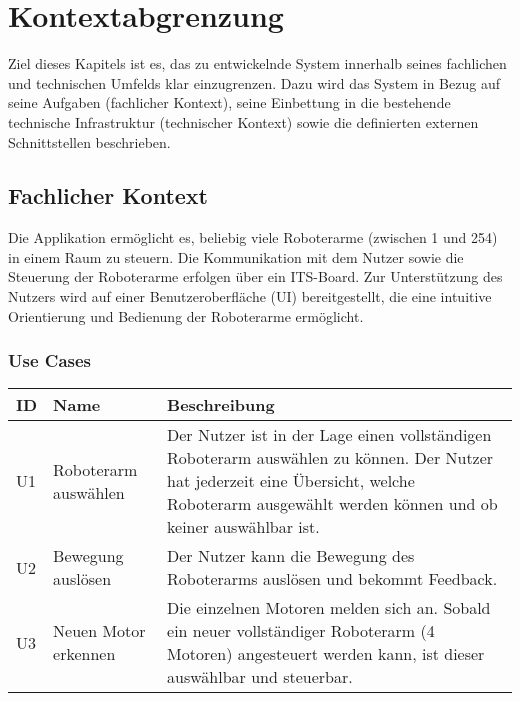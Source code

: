 \chapter{Kontextabgrenzung}
Ziel dieses Kapitels ist es, das zu entwickelnde System innerhalb seines fachlichen und technischen Umfelds klar einzugrenzen. Dazu wird das System in Bezug auf seine Aufgaben (fachlicher Kontext), seine Einbettung in die bestehende technische Infrastruktur (technischer Kontext) sowie die definierten externen Schnittstellen beschrieben.

\section{Fachlicher Kontext}


Die Applikation ermöglicht es, beliebig viele Roboterarme (zwischen 1 und 254) in einem Raum zu steuern. Die Kommunikation mit dem Nutzer sowie die Steuerung der Roboterarme erfolgen über ein ITS-Board. 
Zur Unterstützung des Nutzers wird auf einer Benutzeroberfläche (UI) bereitgestellt, die eine intuitive Orientierung und Bedienung der Roboterarme ermöglicht.

\subsection{Use Cases}
\begin{tabular}{|p{1.5cm}|p{4cm}|p{8.5cm}|}
	\hline
	\textbf{ID} & \textbf{Name} & \textbf{Beschreibung} \\
	\hline
	U1 & Roboterarm auswählen & Der Nutzer ist in der Lage einen vollständigen Roboterarm auswählen zu können. Der Nutzer hat jederzeit eine Übersicht, welche Roboterarm ausgewählt werden können und ob keiner auswählbar ist. \\
	\hline
	U2 & Bewegung auslösen & Der Nutzer kann die Bewegung des Roboterarms auslösen und bekommt Feedback. \\
	\hline
	U3 & Neuen Motor erkennen & Die einzelnen Motoren melden sich an. Sobald ein neuer vollständiger Roboterarm (4 Motoren) angesteuert werden kann, ist dieser auswählbar und steuerbar. \\
	\hline
	
	
		
\end{tabular}

